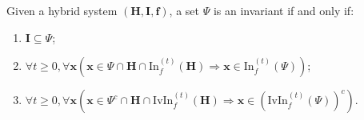 \documentclass{article}
\begin{document}
\begin{Theorem}
\label{thm:inIvin}
Given a hybrid system $(\boldsymbol{H}, \boldsymbol{I}, \boldsymbol{f})$, a set $\Psi$ is an invariant if and only if:
\begin{enumerate}
    \item $\boldsymbol{I} \subseteq \Psi$;
	\item $\forall t \geq 0, \forall \boldsymbol{x} (\boldsymbol{x} \in \Psi \cap \boldsymbol{H} \cap \mathrm{In}_f^{(t)}(\boldsymbol{H}) \Rightarrow \boldsymbol{x} \in \mathrm{In}_f^{(t)}(\Psi))$;
	\item $\forall t \geq 0, \forall \boldsymbol{x} (\boldsymbol{x} \in \Psi^c \cap \boldsymbol{H} \cap \mathrm{IvIn}_f^{(t)}(\boldsymbol{H}) \Rightarrow \boldsymbol{x} \in (\mathrm{IvIn}_f^{(t)}(\Psi))^c)$.
\end{enumerate}
\end{Theorem}
\end{document}
